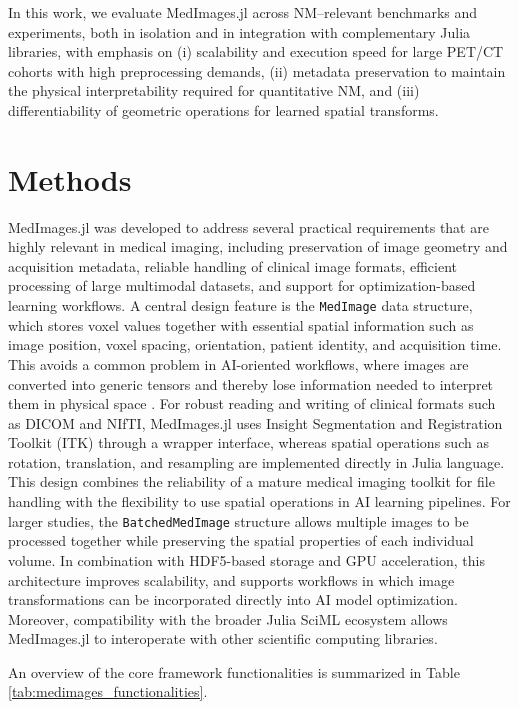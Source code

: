 \documentclass[a4paper,10pt,preprint]{elsarticle}
\begin{document}
In this work, we evaluate MedImages.jl across NM–relevant benchmarks and experiments, both in isolation and in integration with complementary Julia libraries, with emphasis on (i) scalability and execution speed  for large PET/CT cohorts with high preprocessing demands, (ii)  metadata preservation to maintain the physical interpretability required for quantitative NM, and (iii) differentiability of geometric operations for learned spatial transforms.


\section{Methods}

MedImages.jl was developed to address several practical requirements that are highly relevant in medical imaging, including preservation of image geometry and acquisition metadata, reliable handling of clinical image formats, efficient processing of large multimodal datasets, and support for optimization-based learning workflows. 
A central design feature is the \verb|MedImage| data structure, which stores voxel values together with essential spatial information such as image position, voxel spacing, orientation, patient identity, and acquisition time. This avoids a common problem in AI-oriented workflows, where images are converted into generic tensors and thereby lose information needed to interpret them in physical space \cite{}. 
For robust reading and writing of clinical formats such as DICOM and NIfTI, MedImages.jl uses Insight Segmentation and Registration Toolkit (ITK) through a wrapper interface, whereas spatial operations such as rotation, translation, and resampling are implemented directly in Julia language. This design combines the reliability of a mature medical imaging toolkit for file handling with the flexibility to use spatial operations in AI learning pipelines. 
For larger studies, the \verb|BatchedMedImage| structure allows multiple images to be processed together while preserving the spatial properties of each individual volume. In combination with HDF5-based storage and GPU acceleration, this architecture improves scalability, and supports workflows in which image transformations can be incorporated directly into AI model optimization.  
Moreover, compatibility with the broader Julia SciML ecosystem allows MedImages.jl to interoperate with other scientific computing libraries.

An overview of  the core framework functionalities is summarized in Table \ref{tab:medimages_functionalities}.
\end{document}
